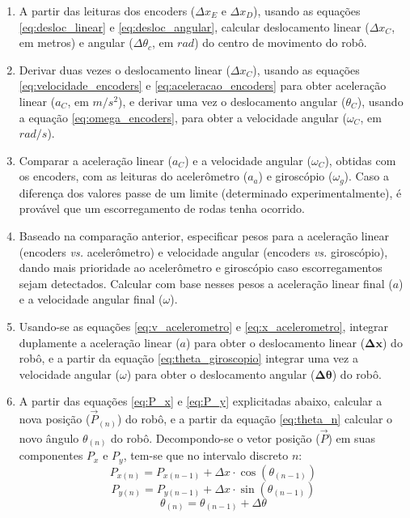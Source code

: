 \begin{enumerate}
  \item A partir das leituras dos encoders ($\Delta x_E$ e $\Delta x_D$), usando as equações \ref{eq:desloc_linear} e \ref{eq:desloc_angular}, calcular deslocamento linear ($\Delta x_C$, em metros) e angular ($\Delta \theta_c$, em $rad$) do centro de movimento do robô.
  \item Derivar duas vezes o deslocamento linear ($\Delta x_C$), usando as equações \ref{eq:velocidade_encoders} e \ref{eq:aceleracao_encoders} para obter aceleração linear ($a_C$, em $m/s^2$), e derivar uma vez o deslocamento angular ($\theta_C$), usando a equação \ref{eq:omega_encoders}, para obter a velocidade angular ($\omega_C$, em $rad/s$).
  \item Comparar a aceleração linear ($a_C$) e a velocidade angular ($\omega_C$), obtidas com os encoders, com as leituras do acelerômetro ($a_a$) e giroscópio ($\omega_g$). Caso a diferença dos valores passe de um limite (determinado experimentalmente), é provável que um escorregamento de rodas tenha ocorrido.
  \item Baseado na comparação anterior, especificar pesos para a aceleração linear (encoders \textit{vs.} acelerômetro) e velocidade angular (encoders \textit{vs.} giroscópio), dando mais prioridade ao acelerômetro e giroscópio caso escorregamentos sejam detectados. Calcular com base nesses pesos a aceleração linear final ($a$) e a velocidade angular final ($\omega$).
  \item Usando-se as equações \ref{eq:v_acelerometro} e \ref{eq:x_acelerometro}, integrar duplamente a aceleração linear ($a$) para obter o deslocamento linear ($\bm{\Delta x}$) do robô, e a partir da equação \ref{eq:theta_giroscopio} integrar uma vez a velocidade angular ($\omega$) para obter o deslocamento angular ($\bm{\Delta \theta}$) do robô.
  \item A partir das equações \ref{eq:P_x} e \ref{eq:P_y} explicitadas abaixo, calcular a nova posição ($\overrightarrow{P}_{(n)}$) do robô, e a partir da equação \ref{eq:theta_n} calcular o novo ângulo $\theta_{(n)}$ do robô. Decompondo-se o vetor posição ($\overrightarrow{P}$) em suas componentes $P_x$ e $P_y$, tem-se que no intervalo discreto $n$:
    \begin{equation}
      P_{x (n)} = P_{x (n-1)} + \Delta x \cdot \cos{(\theta_{(n-1)})}
      \label{eq:P_x}
    \end{equation}
    \begin{equation}
      P_{y (n)} = P_{y (n-1)} + \Delta x \cdot \sin{(\theta_{(n-1)})}
      \label{eq:P_y}
    \end{equation}
    \begin{equation}
      \theta_{(n)} = \theta_{(n-1)} + \Delta \theta
      \label{eq:theta_n}
    \end{equation}
\end{enumerate}


